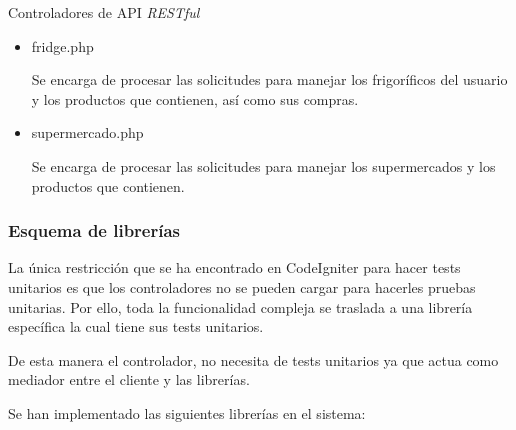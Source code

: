 Controladores de API \emph{RESTful}

    \begin{itemize}
        \item fridge.php

            Se encarga de procesar las solicitudes para manejar los frigoríficos del usuario y los productos que contienen, así como sus compras.

        \item supermercado.php

            Se encarga de procesar las solicitudes para manejar los supermercados y los productos que contienen.

    \end{itemize}

    \subsubsection{Esquema de librerías}

La única restricción que se ha encontrado en CodeIgniter para hacer tests unitarios es que los controladores no se pueden cargar para hacerles pruebas unitarias. Por ello, toda la funcionalidad compleja se traslada a una librería específica la cual tiene sus tests unitarios.

De esta manera el controlador, no necesita de tests unitarios ya que actua como mediador entre el cliente y las librerías.

Se han implementado las siguientes librerías en el sistema:

